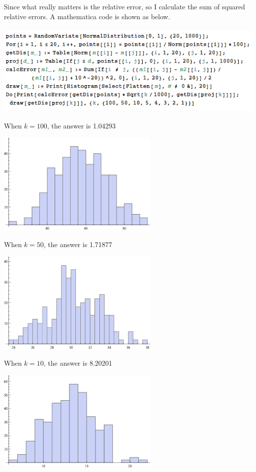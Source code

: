\documentclass[a4paper, 12pt]{mcshw}
\begin{document}
\begin{enumerate}
    \begin{solution}
        Since what really matters is the relative error, so I calculate the sum of squared relative errors. A mathematica code is shown as below. 
        \begin{center}
            \includegraphics[height=4.5cm]{1.png}
        \end{center}
        When $k = 100$, the answer is 1.04293
        \begin{center}
            \includegraphics[height=5cm]{1_gr1.eps}
        \end{center}
        When $k = 50$, the answer is 1.71877
        \begin{center}
            \includegraphics[height=5cm]{1_gr2.eps}
        \end{center}
        When $k = 10$, the answer is 8.20201
        \begin{center}
            \includegraphics[height=5cm]{1_gr3.eps}

\end{center}
\end{solution}
\end{enumerate}
\end{document}

